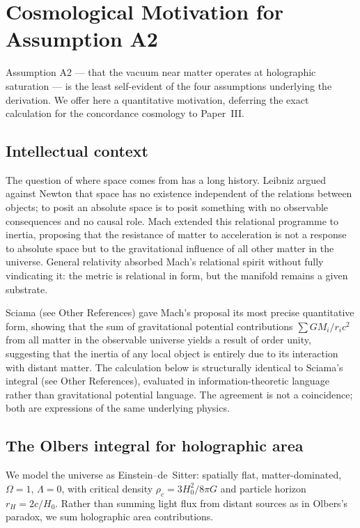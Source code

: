 \documentclass[12pt]{article}
\begin{document}
\appendix
\section{Cosmological Motivation for Assumption A2}
\label{app:A2}

Assumption A2 --- that the vacuum near matter operates at holographic
saturation --- is the least self-evident of the four assumptions
underlying the derivation.
We offer here a quantitative motivation, deferring the exact
calculation for the concordance cosmology to Paper~III.

\subsection*{Intellectual context}

The question of where space comes from has a long history.
Leibniz argued against Newton that space has no existence independent
of the relations between objects; to posit an absolute space is to
posit something with no observable consequences and no causal role.
Mach \cite{Mach1883} extended this relational programme to inertia,
proposing that the resistance of matter to acceleration is not a
response to absolute space but to the gravitational influence of all
other matter in the universe.
General relativity absorbed Mach's relational spirit without fully
vindicating it: the metric is relational in form, but the manifold
remains a given substrate.

Sciama (see Other References) gave Mach's proposal its most precise
quantitative form, showing that the sum of gravitational potential
contributions $\sum GM_i/r_i c^2$ from all matter in the observable
universe yields a result of order unity, suggesting that the inertia
of any local object is entirely due to its interaction with
distant matter.
The calculation below is structurally identical to Sciama's integral
(see Other References),
evaluated in information-theoretic language rather than gravitational
potential language.
The agreement is not a coincidence; both are expressions of the same
underlying physics.

\subsection*{The Olbers integral for holographic area}

We model the universe as Einstein--de~Sitter: spatially flat,
matter-dominated, $\Omega = 1$, $\Lambda = 0$, with critical density
$\rho_c = 3H_0^2/8\pi G$ and particle horizon $r_H = 2c/H_0$.
Rather than summing light flux from distant sources as in Olbers's
paradox, we sum holographic area contributions.
\end{document}
